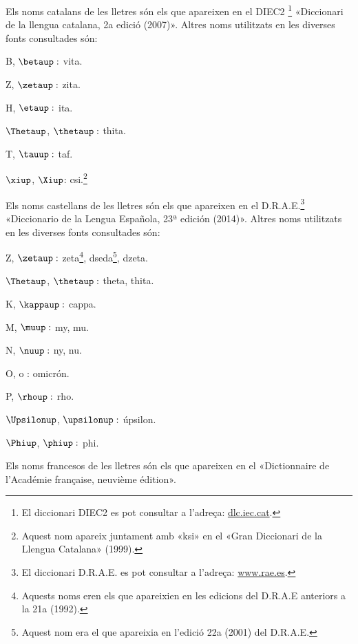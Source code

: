 Els noms catalans de les lletres són els que apareixen en el DIEC2 \footnote{El diccionari DIEC2 es pot consultar a l'adreça: \href{http://dlc.iec.cat/}{dlc.iec.cat}.} «Diccionari de la llengua catalana, 2a edició (2007)». Altres noms utilitzats en
les diverses fonts consultades són:
\begin{multicols}{3}
\begin{list}{}
   {\setlength{\labelwidth}{16mm} \setlength{\leftmargin}{16mm} \setlength{\labelsep}{2mm}}
   \item[B, $\betaup :$] vita.
   \item[Z, $\zetaup :$] zita.
   \item[H, $\etaup :$] ita.
   \item[$\Thetaup$, $\thetaup :$] thita.
   \item[T, $\tauup :$] taf.
   \item[$\xiup$, $\Xiup$:] csi.\footnote{Aquest nom apareix juntament amb «ksi» en el «Gran Diccionari de la Llengua Catalana» (1999).}
\end{list}
\end{multicols}

Els noms castellans de les lletres són els que apareixen en el D.R.A.E.\footnote{El diccionari D.R.A.E. es pot consultar a l'adreça:  \href{http://www.rae.es/}{www.rae.es}.}
«Diccionario de la Lengua Española, 23ª
edición (2014)». Altres noms utilitzats en les diverses fonts
consultades són:
\begin{multicols}{3}
\begin{list}{}
   {\setlength{\labelwidth}{16mm} \setlength{\leftmargin}{16mm} \setlength{\labelsep}{2mm}}
   \item[Z, $\zetaup :$] zeta\footnote{Aquests noms eren els que apareixien en les edicions
   del D.R.A.E anteriors a la 21a (1992).}, dseda\footnote{Aquest nom era el que apareixia en l'edició 22a (2001) del D.R.A.E.}, dzeta.
   \item[$\Thetaup$, $\thetaup :$] theta\footnotemark[4], thita.
   \item[K, $\kappaup :$] cappa.
   \item[M, $\muup :$] my\footnotemark[4], mu.
   \item[N, $\nuup :$] ny\footnotemark[4], nu.
   \item[O, o :] omicrón.
   \item[P, $\rhoup :$] rho.
   \item[$\Upsilonup$, $\upsilonup :$] úpsilon.
   \item[$\Phiup$, $\phiup :$] phi.
\end{list}
\end{multicols}

Els noms francesos de les lletres són els que apareixen en el «Dictionnaire de l'Académie française, neuvième édition». 